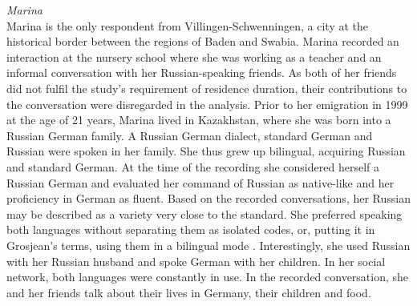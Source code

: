 \noindent \textit{Marina}\\
Marina is the only respondent from Villingen-Schwenningen, a city at the historical border between the regions of  Baden and Swabia. Marina recorded an interaction at the nursery school where she was working as a teacher and an informal conversation with her Russian-speaking friends. As both of her friends did not fulfil the study's requirement of residence duration, their contributions to the conversation were disregarded in the analysis. Prior to her emigration in 1999 at the age of 21 years, Marina lived in Kazakhstan, where she was born into a Russian German family. A Russian German dialect, standard German and Russian were spoken in her family. She thus grew up bilingual, acquiring Russian and standard German. At the time of the recording she considered herself a Russian German and evaluated her command of Russian as native-like and her proficiency in German as fluent. Based on the recorded conversations, her Russian may be described as a variety very close to the standard. She preferred speaking both languages without separating them as isolated codes, or, putting it in Grosjean's terms, using them in a bilingual mode \citep[cf.][]{grosjean85}. Interestingly, she used Russian with her Russian husband and spoke German with her children. In her social network, both languages were constantly in use. In the recorded conversation, she and her friends talk about their lives in Germany, their children and food.\\

